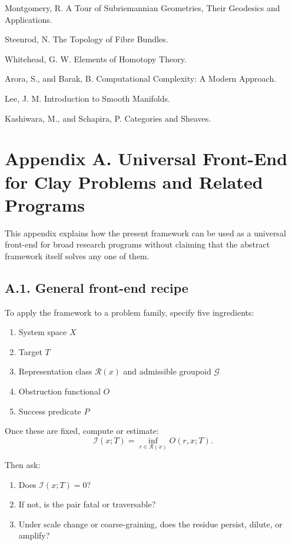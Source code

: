 \documentclass[
]{article}
\providecommand{\tightlist}{%
  \setlength{\itemsep}{0pt}\setlength{\parskip}{0pt}}
\begin{document}
Montgomery, R. A Tour of Subriemannian Geometries, Their Geodesics and
Applications.

Steenrod, N. The Topology of Fibre Bundles.

Whitehead, G. W. Elements of Homotopy Theory.

Arora, S., and Barak, B. Computational Complexity: A Modern Approach.

Lee, J. M. Introduction to Smooth Manifolds.

Kashiwara, M., and Schapira, P. Categories and Sheaves.

\section{Appendix A. Universal Front-End for Clay Problems and Related
Programs}\label{appendix-a.-universal-front-end-for-clay-problems-and-related-programs}

This appendix explains how the present framework can be used as a
universal front-end for broad research programs without claiming that
the abstract framework itself solves any one of them.

\subsection{A.1. General front-end
recipe}\label{a.1.-general-front-end-recipe}

To apply the framework to a problem family, specify five ingredients:

\begin{enumerate}
\def\labelenumi{\arabic{enumi}.}
\tightlist
\item
  System space \(X\)
\item
  Target \(T\)
\item
  Representation class \(\mathcal{R}(x)\) and admissible groupoid
  \(\mathcal{G}\)
\item
  Obstruction functional \(O\)
\item
  Success predicate \(P\)
\end{enumerate}

Once these are fixed, compute or estimate: \[
\mathcal{I}(x;T) = \inf_{r \in \mathcal{R}(x)} O(r,x;T).
\]

Then ask:

\begin{enumerate}
\def\labelenumi{\arabic{enumi}.}
\tightlist
\item
  Does \(\mathcal{I}(x;T)=0\)?
\item
  If not, is the pair fatal or traversable?
\item
  Under scale change or coarse-graining, does the residue persist,
  dilute, or amplify?
\end{enumerate}
\end{document}
